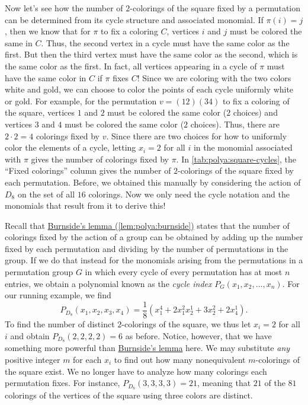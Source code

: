 Now let's see how the number of $2$-colorings of the square fixed by a
permutation can be determined from its cycle structure and associated
monomial. If $\pi(i)=j$, then we know that for $\pi$ to fix a coloring
$C$, vertices $i$ and $j$ must be colored the same in $C$. Thus, the
second vertex in a cycle must have the same color as the first. But
then the third vertex must have the same color as the second, which is
the same color as the first. In fact, all vertices appearing in a
cycle of $\pi$ must have the same color in $C$ if $\pi$ fixes $C$!
Since we are coloring with the two colors white and gold, we can
choose to color the points of each cycle uniformly white or gold. For
example, for the permutation $v=(12)(34)$ to fix a coloring of the
square, vertices $1$ and $2$ must be colored the same color ($2$
choices) and vertices $3$ and $4$ must be colored the same color ($2$
choices). Thus, there are $2\cdot 2=4$ colorings fixed by $v$. Since
there are two choices for how to uniformly color the elements of a
cycle, letting $x_i=2$ for all $i$ in the monomial associated with
$\pi$ gives the number of colorings fixed by $\pi$. In
\autoref{tab:polya:square-cycles}, the ``Fixed colorings'' column
gives the number of $2$-colorings of the square fixed by each
permutation. Before, we obtained this manually by considering the
action of $D_8$ on the set of all $16$ colorings. Now we only need the
cycle notation and the monomials that result from it to derive this!

Recall that \hyperref[lem:polya:burnside]{Burnside's lemma
  (\ref{lem:polya:burnside})} states that the number of colorings
fixed by the action of a group can be obtained by adding up the number
fixed by each permutation and dividing by the number of permutations
in the group. If we do that instead for the monomials arising from the
permutations in a permutation group $G$ in which every cycle of every
permutation has at most $n$ entries, we obtain a polynomial known as
the \emph{cycle index} $P_G(x_1,x_2,\dots,x_n)$. For our running
example, we find
\[P_{D_8}(x_1,x_2,x_3,x_4) = \frac{1}{8}\left(x_1^4 + 2x_1^2x_2^1 +
  3x_2^2 + 2x_4^1\right).\] To find the number of distinct
$2$-colorings of the square, we thus let $x_i=2$ for all $i$ and
obtain $P_{D_8}(2,2,2,2) = 6$ as before. Notice, however, that we have
something more powerful than \hyperref[lem:polya:burnside]{Burnside's
  lemma} here. We may substitute \emph{any} positive integer $m$ for
each $x_i$ to find out how many nonequivalent $m$-colorings of the
square exist. We no longer have to analyze how many colorings each
permutation fixes. For instance, $P_{D_8}(3,3,3,3) = 21$, meaning that
$21$ of the $81$ colorings of the vertices of the square using three
colors are distinct.

